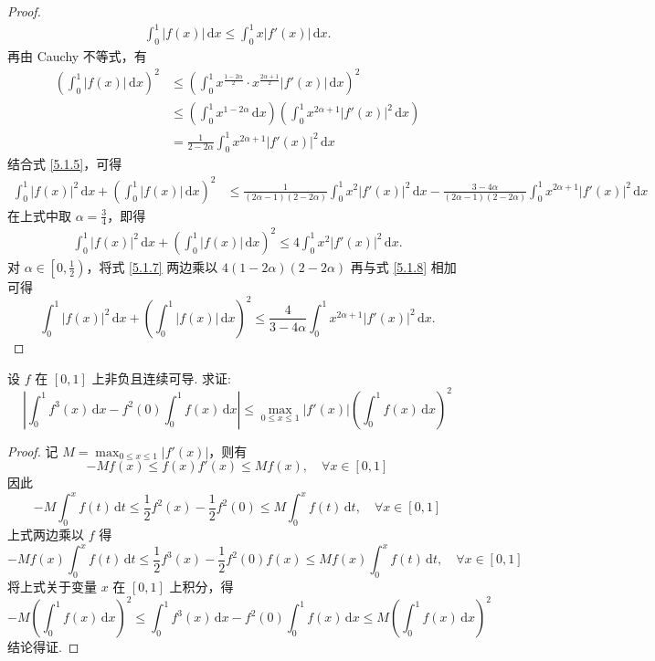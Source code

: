 \documentclass[../../main.tex]{subfiles}
\begin{document}
\begin{proof}
\begin{align}
\int_{0}^{1} |f(x)| \, \mathrm{d}x \leqslant \int_{0}^{1} x |f'(x)| \, \mathrm{d}x. \label{5.1.6}
\end{align}
再由 Cauchy 不等式，有
\begin{align*}
\left( \int_{0}^{1} |f(x)| \, \mathrm{d}x \right)^2 &\leqslant \left( \int_{0}^{1} x^{\frac{1 - 2\alpha}{2}} \cdot x^{\frac{2\alpha + 1}{2}} |f'(x)| \, \mathrm{d}x \right)^2 \\
&\leqslant \left( \int_{0}^{1} x^{1 - 2\alpha} \, \mathrm{d}x \right) \left( \int_{0}^{1} x^{2\alpha + 1} |f'(x)|^2 \, \mathrm{d}x \right)
\\
&= \frac{1}{2 - 2\alpha} \int_{0}^{1} x^{2\alpha + 1} |f'(x)|^2 \, \mathrm{d}x
\end{align*}
结合式 \eqref{5.1.5}，可得
\begin{align}
\int_{0}^{1} |f(x)|^2 \, \mathrm{d}x + \left( \int_{0}^{1} |f(x)| \, \mathrm{d}x \right)^2 &\leqslant \frac{1}{(2\alpha - 1)(2 - 2\alpha)} \int_{0}^{1} x^2 |f'(x)|^2 \, \mathrm{d}x - \frac{3 - 4\alpha}{(2\alpha - 1)(2 - 2\alpha)} \int_{0}^{1} x^{2\alpha + 1} |f'(x)|^2 \, \mathrm{d}x \label{5.1.7}
\end{align}
在上式中取 \( \alpha = \frac{3}{4} \)，即得
\begin{align}
\int_{0}^{1} |f(x)|^2 \, \mathrm{d}x + \left( \int_{0}^{1} |f(x)| \, \mathrm{d}x \right)^2 \leqslant 4 \int_{0}^{1} x^2 |f'(x)|^2 \, \mathrm{d}x .\label{5.1.8}
\end{align}
对 \( \alpha \in \left[0, \frac{1}{2}\right) \)，将式 \eqref{5.1.7} 两边乘以 \( 4(1 - 2\alpha)(2 - 2\alpha) \) 再与式 \eqref{5.1.8} 相加可得
\[
\int_{0}^{1} |f(x)|^2 \, \mathrm{d}x + \left( \int_{0}^{1} |f(x)| \, \mathrm{d}x \right)^2 \leqslant \frac{4}{3 - 4\alpha} \int_{0}^{1} x^{2\alpha + 1} |f'(x)|^2 \, \mathrm{d}x.
\]
\end{proof}

\begin{example}
设 \( f \) 在 \([0,1]\) 上非负且连续可导. 求证:
\[
\left| \int_{0}^{1} f^3(x) \, \mathrm{d}x - f^2(0) \int_{0}^{1} f(x) \, \mathrm{d}x \right| \leqslant \max_{0 \leqslant x \leqslant 1} |f'(x)| \left( \int_{0}^{1} f(x) \, \mathrm{d}x \right)^2
\]
\end{example}
\begin{proof}
记 \( M = \max_{0 \leqslant x \leqslant 1} |f'(x)| \)，则有
\[
-M f(x) \leqslant f(x) f'(x) \leqslant M f(x), \quad \forall x \in [0,1]
\]
因此
\[
-M \int_{0}^{x} f(t) \, \mathrm{d}t \leqslant \frac{1}{2} f^2(x) - \frac{1}{2} f^2(0) \leqslant M \int_{0}^{x} f(t) \, \mathrm{d}t, \quad \forall x \in [0,1]
\]
上式两边乘以 \( f \) 得
\[
-M f(x) \int_{0}^{x} f(t) \, \mathrm{d}t \leqslant \frac{1}{2} f^3(x) - \frac{1}{2} f^2(0) f(x) \leqslant M f(x) \int_{0}^{x} f(t) \, \mathrm{d}t, \quad \forall x \in [0,1]
\]
将上式关于变量 \( x \) 在 \([0,1]\) 上积分，得
\[
-M \left( \int_{0}^{1} f(x) \, \mathrm{d}x \right)^2 \leqslant \int_{0}^{1} f^3(x) \, \mathrm{d}x - f^2(0) \int_{0}^{1} f(x) \, \mathrm{d}x \leqslant M \left( \int_{0}^{1} f(x) \, \mathrm{d}x \right)^2
\]
结论得证.
\end{proof}
\end{document}
